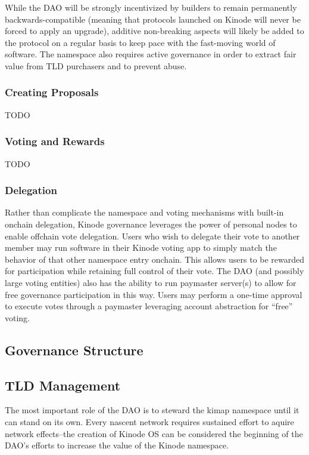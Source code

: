 \documentclass[runningheads]{llncs}
\begin{document}
While the DAO will be strongly incentivized by builders to remain permanently backwards-compatible (meaning that protocols launched on Kinode will never be forced to apply an upgrade), additive non-breaking aspects will likely be added to the protocol on a regular basis to keep pace with the fast-moving world of software. The namespace also requires active governance in order to extract fair value from TLD purchasers and to prevent abuse.

\subsubsection{Creating Proposals}

TODO

\subsubsection{Voting and Rewards}

TODO

\subsubsection{Delegation}

Rather than complicate the namespace and voting mechanisms with built-in onchain delegation, Kinode governance leverages the power of personal nodes to enable offchain vote delegation.
Users who wish to delegate their vote to another member may run software in their Kinode voting app to simply match the behavior of that other namespace entry onchain.
This allows users to be rewarded for participation while retaining full control of their vote.
The DAO (and possibly large voting entities) also has the ability to run paymaster server(s) to allow for free governance participation in this way.
Users may perform a one-time approval to execute votes through a paymaster leveraging account abstraction for “free” voting.

\subsection{Governance Structure}



\subsection{TLD Management}

The most important role of the DAO is to steward the kimap namespace until it can stand on its own.
Every nascent network requires sustained effort to aquire network effects–the creation of Kinode OS can be considered the beginning of the DAO's efforts to increase the value of the Kinode namespace.
\end{document}
